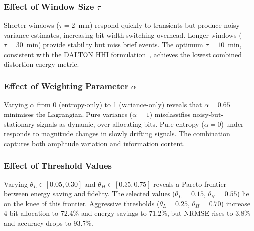 \subsubsection{Effect of Window Size $\tau$}

Shorter windows ($\tau = 2$~min) respond quickly to transients but produce noisy variance estimates, increasing bit-width switching overhead. Longer windows ($\tau = 30$~min) provide stability but miss brief events. The optimum $\tau = 10$~min, consistent with the DALTON HHI formulation~\cite{karmakar2024exploring}, achieves the lowest combined distortion-energy metric.

\subsubsection{Effect of Weighting Parameter $\alpha$}

Varying $\alpha$ from 0 (entropy-only) to 1 (variance-only) reveals that $\alpha = 0.65$ minimises the Lagrangian. Pure variance ($\alpha = 1$) misclassifies noisy-but-stationary signals as dynamic, over-allocating bits. Pure entropy ($\alpha = 0$) under-responds to magnitude changes in slowly drifting signals. The combination captures both amplitude variation and information content.

\subsubsection{Effect of Threshold Values}

Varying $\theta_L \in [0.05, 0.30]$ and $\theta_H \in [0.35, 0.75]$ reveals a Pareto frontier between energy saving and fidelity. The selected values ($\theta_L = 0.15$, $\theta_H = 0.55$) lie on the knee of this frontier. Aggressive thresholds ($\theta_L = 0.25$, $\theta_H = 0.70$) increase 4-bit allocation to 72.4\% and energy savings to 71.2\%, but NRMSE rises to 3.8\% and accuracy drops to 93.7\%.
